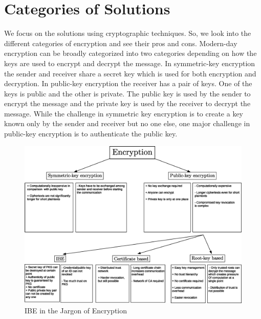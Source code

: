 \documentclass[conference]{IEEEtran}
\begin{document}
\section{Categories of Solutions}
We focus on the solutions using cryptographic techniques. So, we look into the different categories of encryption and see their pros and cons. Modern-day encryption can be broadly categorized into two categories depending on how the keys are used to encrypt and decrypt the message. In symmetric-key encryption the sender and receiver share a secret key which is used for both encryption and decryption. In public-key encryption the receiver has a pair of keys. One of the keys is public and the other is private. The public key is used by the sender to encrypt the message and the private key is used by the receiver to decrypt the message. While the challenge in symmetric key encryption is to create a key known only by the sender and receiver but no one else, one major challenge in public-key encryption is to authenticate the public key.
\begin{figure}
\begin{center}
  \includegraphics[width=.98\textwidth]{ibc_in_jargon_of_crypto.eps}
\caption{IBE in the Jargon of Encryption}
\label{fig:ibe_in_the_jargon_of_cryptography}       %
\end{center}
\end{figure}
\end{document}
